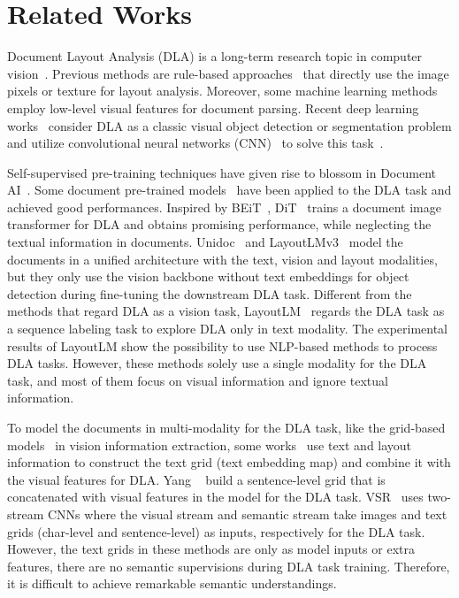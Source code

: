 \documentclass[10pt,twocolumn,letterpaper]{article}
\begin{document}
\section{Related Works}
Document Layout Analysis (DLA) is a long-term research topic in computer vision~\cite{binmakhashen2019document}.
Previous methods are rule-based approaches~\cite{rule1,rule2} that directly use the image pixels or texture for layout analysis.
Moreover, some machine learning methods~\cite{ml1,ml2} employ low-level visual features for document parsing.
Recent deep learning works~\cite{schreiber2017deepdesrt,CascadeTabNet} consider DLA as a classic visual object detection or segmentation problem and utilize convolutional neural networks (CNN)~\cite{he2016deep} to solve this task~\cite{ren2015faster,liu2016ssd, redmon2018yolov3, he2017mask}.

Self-supervised pre-training techniques have given rise to blossom in Document AI~\cite{xu2020layoutlm,xu2020layoutlmv2,li2021structext,appalaraju2021docformer,luo2022bivldoc,huang2022layoutlmv3,li2022dit,gu2021unidoc,Luo_2023_CVPR}. 
Some document pre-trained models~\cite{huang2022layoutlmv3,li2022dit,gu2021unidoc} have been applied to the DLA task and achieved good performances.
Inspired by BEiT~\cite{bao2021beit}, DiT~\cite{li2022dit} trains a document image transformer for DLA and obtains promising performance, while neglecting the textual information in documents.
Unidoc~\cite{gu2021unidoc} and LayoutLMv3~\cite{huang2022layoutlmv3} model the documents in a unified architecture with the text, vision and layout modalities, but they only use the vision backbone without text embeddings for object detection during fine-tuning the downstream DLA task.
Different from the methods that regard DLA as a vision task, LayoutLM~\cite{xu2020layoutlm} regards the DLA task as a sequence labeling task to explore DLA only in text modality.
The experimental results of LayoutLM show the possibility to use NLP-based methods to process DLA tasks.
However, these methods solely use a single modality for the DLA task, and most of them focus on visual information and  ignore textual information.

To model the documents in multi-modality for the DLA task, like the grid-based models~\cite{katti2018chargrid,denk2019bertgrid,lin2021vibertgrid} in vision information extraction, some works~\cite{yang2017learning,zhang2021vsr} use text and layout information to construct the text grid (text embedding map) and combine it with the visual features for DLA.
Yang \etal~\cite{yang2017learning} build a sentence-level grid that is concatenated with visual features in the model for the DLA task.
VSR~\cite{zhang2021vsr} uses two-stream CNNs where the visual stream and semantic stream take images and text grids (char-level and sentence-level) as inputs, respectively for the DLA task.
However, the text grids in these methods are only as model inputs or extra features, there are no semantic supervisions during DLA task training. Therefore, it is difficult to achieve remarkable semantic understandings.
\end{document}
